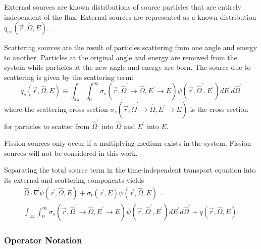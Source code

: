 External sources are known distributions of source particles that are entirely independent of the flux.
External sources are represented as a known distribution $q_{ex}\left(\vec{r},\hat{\Omega},E\right)$.

Scattering sources are the result of particles scattering from one angle and energy to another.
Particles at the original angle and energy are removed from the system while particles at the new angle and energy are born.
The source due to scattering is given by the scattering term:
\begin{equation}\label{eq:bg:rt:scattering-term}
  q_s\left(\vec{r},\hat{\Omega},E\right) \equiv
  \int_{4\pi}\int_0^\infty\sigma_s\left(\vec{r},\hat{\Omega}^\prime\rightarrow\hat{\Omega},E^\prime\rightarrow E\right)\psi\left(\vec{r},\hat{\Omega}^\prime,E^\prime\right)dE^\prime d\hat{\Omega}^\prime
\end{equation}
where the scattering cross section $\sigma_s\left(\vec{r},\hat{\Omega}^\prime\rightarrow\hat{\Omega},E^\prime\rightarrow E\right)$ is the cross section for particles to scatter from $\hat{\Omega}^\prime$ into $\hat{\Omega}$ and $E^\prime$ into $E$.

Fission sources only occur if a multiplying medium exists in the system.
Fission sources will not be considered in this work.

Separating the total source term in the time-independent transport equation into its external and scattering components yields
\begin{multline}\label{eq:bg:rt:transport}
  \hat{\Omega}\cdot\vec{\nabla}\psi\left(\vec{r},\hat{\Omega},E\right) +
  \sigma_t\left(\vec{r},E\right)\psi\left(\vec{r},\hat{\Omega},E\right) = \\
  \int_{4\pi}\int_0^\infty\sigma_s\left(\vec{r},\hat{\Omega}^\prime\rightarrow\hat{\Omega},E^\prime\rightarrow E\right)\psi\left(\vec{r},\hat{\Omega}^\prime,E^\prime\right)dE^\prime d\hat{\Omega}^\prime +
  q\left(\vec{r},\hat{\Omega},E\right).
\end{multline}

\subsubsection{Operator Notation}
\label{sec:bg:rt:te:on}

